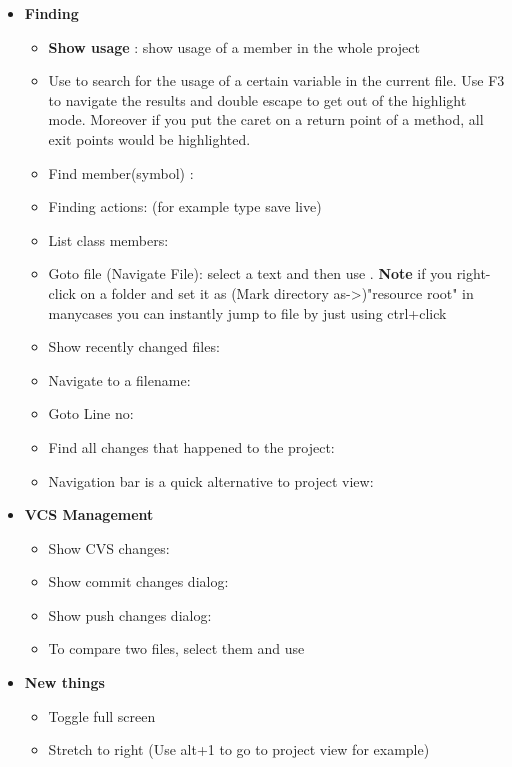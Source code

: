 \begin{itemize}
	\item \textbf{Finding}
	\begin{itemize}
		\item \textbf{Show usage }: show usage of a member in the whole project
		\item Use  to search for the usage of a certain variable in the current file. Use F3 to navigate the results and double escape to get out of the highlight mode. Moreover if you put the caret on a return point of a method, all exit points would be highlighted.
		\item Find member(symbol) : 
		\item Finding actions:  (for example type save live)
		\item List class members: 
		\item Goto file (Navigate File): select a text and then use . \textbf{Note} if you right-click on a folder and set it as (Mark directory as->)"resource root" in manycases you can instantly jump to file by just using ctrl+click
		\item Show recently changed files: 
		\item Navigate to a filename: 
		\item Goto Line no: 
		\item Find all changes that happened to the project: 
		\item Navigation bar is a quick alternative to project view: 
	\end{itemize}
	\item \textbf{VCS Management}
	\begin{itemize}
		\item Show CVS changes: 
		\item Show commit changes dialog: 
		\item Show push changes dialog: 
		\item To compare two files, select them and use 
	\end{itemize}
	\item \textbf{New things}
	\begin{itemize}
		\item Toggle full screen 
		\item Stretch to right  (Use alt+1 to go to project view for example)

\end{itemize}
\end{itemize}
